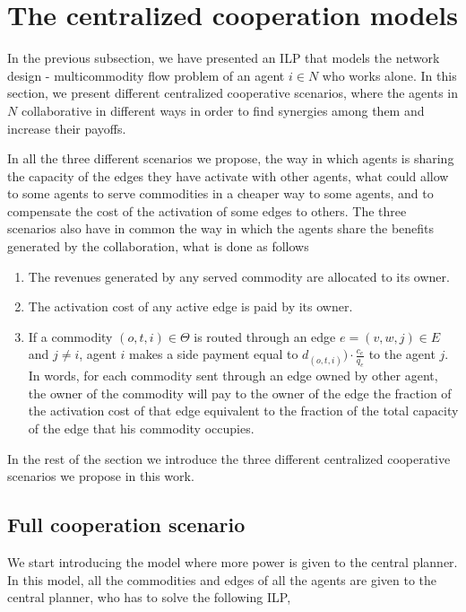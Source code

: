 \documentclass[review]{elsarticle}
\begin{document}
\section{The centralized cooperation models}

In the previous subsection, we have presented an ILP that models the network design - multicommodity flow problem of an agent $i\in N$ who works alone. In this section, we present different centralized cooperative scenarios, where the agents in $N$ collaborative in different ways in order to find synergies among them and increase their payoffs.

In all the three different scenarios we propose, the way in which agents is sharing the capacity of the edges they have activate with other agents, what could allow to some agents to serve commodities in a cheaper way to some agents, and to compensate the cost of the activation of some edges to others. The three scenarios also have in common the way in which the agents share the benefits generated by the collaboration, what is done as follows
\begin{enumerate}
    \item The revenues generated by any served commodity are
    allocated to its owner.
    \item The activation cost of any active edge is paid by its owner.
    \item If a commodity $(o,t,i)\in \Theta$ is routed through an edge $e=(v,w,j)		\in E$ and $j\not = i$, agent $i$ makes a side payment equal to $d_{(o,t,i)})		\cdot\frac{c_e}{q_e}$ to the agent $j$. In words, for each commodity sent 		through an edge owned by other agent, the owner of the commodity will pay to 		the owner of the edge the fraction of the activation cost of that edge 			equivalent 	to the fraction of the total capacity of the edge that his 			commodity occupies.
\end{enumerate}

In the rest of the section we introduce the three different centralized
cooperative scenarios we propose in this work.


\subsection{Full cooperation scenario}

We start introducing the model where more power is given to the central planner.
In this model, all the commodities and edges of all the agents are given to the
central planner, who has to solve the following ILP,
\end{document}
